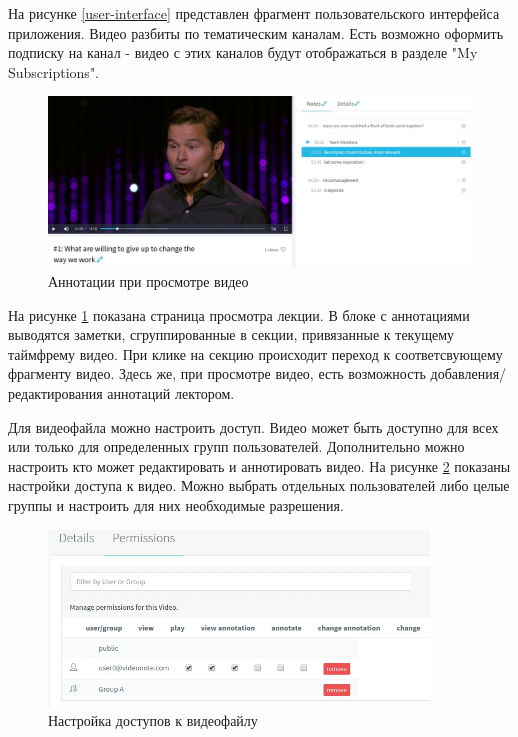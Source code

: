 На рисунке \ref{user-interface} представлен фрагмент пользовательского интерфейса приложения.
Видео разбиты по тематическим каналам. Есть возможно оформить подписку на канал - видео с этих
каналов будут отображаться в разделе "My Subscriptions".

\FloatBarrier

\begin{figure}
  \centering
  \includegraphics[width=1\textwidth]{images/annotations.jpg}
  \caption{Аннотации при просмотре видео}\label{annotations}
\end{figure}

На рисунке \ref{annotations} показана страница просмотра лекции. В блоке с аннотациями
выводятся заметки, сгруппированные в секции, привязанные к текущему таймфрему видео.
При клике на секцию происходит переход к соответсвующему фрагменту видео. Здесь же, при просмотре
видео, есть возможность добавления/редактирования аннотаций лектором.

\FloatBarrier

Для видеофайла можно настроить доступ. Видео может быть доступно для всех или только для
определенных групп пользователей. Дополнительно можно настроить кто может редактировать и
аннотировать видео. На рисунке \ref{permissions} показаны настройки доступа к видео. Можно
выбрать отдельных пользователей либо целые группы и настроить для них необходимые разрешения.

\begin{figure}
  \centering
  \includegraphics[width=0.9\textwidth]{images/permissions.jpg}
  \caption{Настройка доступов к видеофайлу}\label{permissions}
\end{figure}

